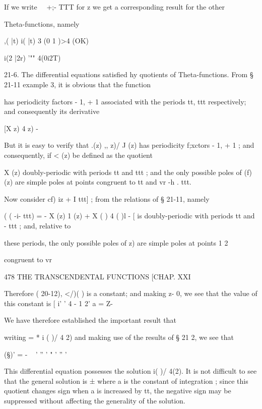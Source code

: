 If we write \ \ +;- TTT for z we get a corresponding result for the
other

Theta-functions, namely

 ,( |t) i( |t) 3 (0 1 )>4 (OK)

 i(2 |2r) '"" 4(0i2T)

21-6. The differential equations satisfied hy quotients of
Theta-functions. From § 21-11 example 3, it is obvious that the
function

has periodicity factors - 1, + 1 associated with the periods tt, ttt
respectively; and consequently its derivative

[X z) 4 z) - %

But it is easy to verify that .(z) ,, z)/ J (z) has periodicity
f;xctors - 1, + 1 ; and consequently, if < (z) be defined as the
quotient

 X (z) %
doubly-periodic with periods tt and ttt ; and the only possible poles
of (f) (z) are simple poles at points congruent to tt and vr -h . ttt.



Now consider cf) iz + I ttt] ; from the relations of § 21-11, namely



( ( -i- ttt) = - X (z) 1 (z) + X ( ) 4 ( )l - [%
is doubly-periodic with periods tt and - ttt ; and, relative to



these periods, the only possible poles of z) are simple poles at
points 1 2



congruent to vr



478 THE TRANSCENDENTAL FUNCTIONS [CHAP. XXI

Therefore ( 20-12), </)( ) is a constant; and making z- 0, we see that
the value of this constant is [ i' ' 4 - 1 2' a = Z-

We have therefore established the important result that

writing = * i ( )/ 4 2) and making use of the results of § 21 2, we
see that

(§)' = - ~ ' '' ' " ' '' '

This differential equation possesses the solution i( )/ 4(2). It is
not difficult to see that the general solution is ±%
where a is the constant of integration ; since this quotient changes
sign when a is increased by tt, the negative sign may be suppressed
without affecting the generality of the solution.

